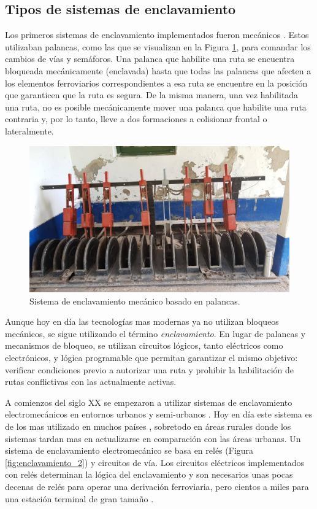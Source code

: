 \subsection{Tipos de sistemas de enclavamiento}
	\label{sec:FPGA}
	
    Los primeros sistemas de enclavamiento implementados fueron mecánicos \cite{Paper_179}. Estos utilizaban palancas, como las que se visualizan en la Figura \ref{fig:enclavamiento_1}, para comandar los cambios de vías y semáforos. Una palanca que habilite una ruta se encuentra bloqueada mecánicamente (enclavada) hasta que todas las palancas que afecten a los elementos ferroviarios correspondientes a esa ruta se encuentre en la posición que garanticen que la ruta es segura. De la misma manera, una vez habilitada una ruta, no es posible mecánicamente mover una palanca que habilite una ruta contraria y, por lo tanto, lleve a dos formaciones a colisionar frontal o lateralmente.
    
        \begin{figure}[H]
            \centering
            \includegraphics[width=1\textwidth]{Figuras/palancas.jpg}
            \centering\caption{Sistema de enclavamiento mecánico basado en palancas.}
            \label{fig:enclavamiento_1}
        \end{figure}

    Aunque hoy en día las tecnologías mas modernas ya no utilizan bloqueos mecánicos, se sigue utilizando el término \textit{enclavamiento}. En lugar de palancas y mecanismos de bloqueo, se utilizan circuitos lógicos, tanto eléctricos como electrónicos, y lógica programable que permitan garantizar el mismo objetivo: verificar condiciones previo a autorizar una ruta y prohibir la habilitación de rutas conflictivas con las actualmente activas.

    A comienzos del siglo XX se empezaron a utilizar sistemas de enclavamiento electromecánicos en entornos urbanos y semi-urbanos \cite{Paper_1}. Hoy en día este sistema es de los mas utilizado en muchos países \cite{Paper_179}, sobretodo en áreas rurales donde los sistemas tardan mas en actualizarse en comparación con las áreas urbanas. Un sistema de enclavamiento electromecánico se basa en relés (Figura \ref{fig:enclavamiento_2}) y circuitos de vía. Los circuitos eléctricos implementados con relés determinan la lógica del enclavamiento y son necesarios unas pocas decenas de relés para operar una derivación ferroviaria, pero cientos a miles para una estación terminal de gran tamaño \cite{Paper_199}.

